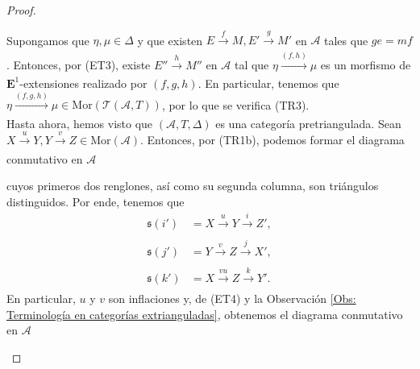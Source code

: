 \documentclass[tesis]{subfiles}
\begin{document}
\begin{proof}
\begin{enumerate}[label=(\alph*)]
            Supongamos que $\eta,\mu\in\Delta$ y que existen $E\xrightarrow[]{f}M, E'\xrightarrow[]{g}M'$ en $\mathscr{A}$ tales que $ge = mf$. Entonces, por (ET3), existe $E''\xrightarrow[]{h}M''$ en $\mathscr{A}$ tal que $\eta\xrightarrow[]{(f,h)}\mu$ es un morfismo de $\mathbf{E}^1$-extensiones realizado por $(f,g,h)$. En particular, tenemos que $\eta\xrightarrow[]{(f,g,h)}\mu\in\text{Mor}(\mathscr{T}(\mathscr{A},T))$, por lo que se verifica (TR3). \\

            Hasta ahora, hemos visto que $(\mathscr{A},T,\Delta)$ es una categoría pretriangulada. Sean $X\xrightarrow[]{u}Y, Y\xrightarrow[]{v}Z\in\text{Mor}(\mathscr{A})$. Entonces, por (TR1b), podemos formar el diagrama conmutativo en $\mathscr{A}$
            \begin{center}
            \end{center}
            cuyos primeros dos renglones, así como su segunda columna, son triángulos distinguidos. Por ende, tenemos que
            \begin{align*}
                \mathfrak{s}(i') &= X\xrightarrow[]{u}Y\xrightarrow[]{i}Z', \\
                \mathfrak{s}(j') &= Y\xrightarrow[]{v}Z\xrightarrow[]{j}X',\\
                \mathfrak{s}(k') &= X\xrightarrow[]{vu}Z\xrightarrow[]{k}Y'.
            \end{align*}
            En particular, $u$ y $v$ son inflaciones y, de (ET4) y la Observación \ref{Obs: Terminología en categorías extrianguladas}, obtenemos el diagrama conmutativo en $\mathscr{A}$
            \begin{center}
                \begin{tikzcd}

\end{tikzcd}
\end{center}
\end{enumerate}
\end{proof}
\end{document}
